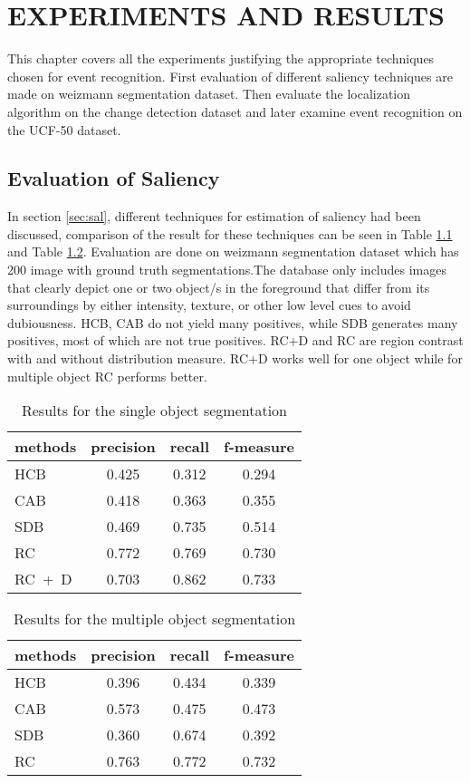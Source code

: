 \chapter{EXPERIMENTS AND RESULTS}
This chapter covers all the experiments justifying the appropriate techniques chosen for event recognition. First evaluation of different saliency techniques are made on weizmann segmentation dataset. Then  evaluate the localization algorithm on the change detection dataset and later examine  event recognition on the UCF-50 dataset.
\section{Evaluation of Saliency}
\label{sec:ES}
In section \ref{sec:sal}, different techniques for estimation of saliency had been discussed, comparison of the result for these techniques can be seen in Table \ref{tab:salOneObj} and Table \ref{tab:salTwoObj}. Evaluation are done on weizmann segmentation dataset which has 200 image with ground truth segmentations.The database only includes images that clearly depict one or two object/s in the foreground that differ from its surroundings by either intensity, texture, or other low level cues to avoid dubiousness.    HCB, CAB do not yield many positives, while SDB generates many positives, most of which are not true positives. RC+D and RC are region contrast with and without distribution measure. RC+D works well for one object while for multiple object RC performs better.
\begin{table}[htbp]
   \caption{Results for the single object segmentation}
   \begin{center}
   \begin{tabular}{|l|c|c|c|} \hline
     methods & precision & recall & f-measure \\ \hline
     HCB & 0.425 & 0.312 & 0.294 \\
	 CAB & 0.418 & 0.363 & 0.355 \\
 	 SDB & 0.469 & 0.735 & 0.514 \\
	 RC  & 0.772 & 0.769 & 0.730 \\
	 RC~+~D & 0.703	& 0.862 & 0.733	\\ \hline
   \end{tabular}
   \label{tab:salOneObj}
   \medskip \small 
   \end{center}
 \end{table}
\begin{table}[htbp]
   \caption{Results for the multiple object segmentation}
   \begin{center}
   \begin{tabular}{|l|c|c|c|} \hline
     methods & precision & recall & f-measure \\ \hline
     HCB & 0.396 & 0.434 & 0.339 \\
	 CAB & 0.573 & 0.475 & 0.473 \\
 	 SDB & 0.360 & 0.674 & 0.392 \\
	 RC  & 0.763 & 0.772 & 0.732 \\ \hline
   \end{tabular}
   \label{tab:salTwoObj}
   \end{center}
 \end{table} 
